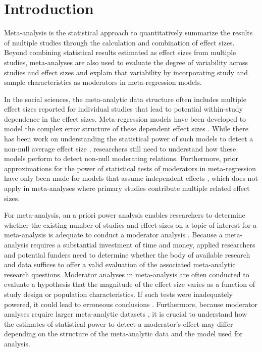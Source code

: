 \chapter{Introduction}

Meta-analysis is the statistical approach to quantitatively summarize the results of multiple studies through the calculation and combination of effect sizes. Beyond combining statistical results estimated as effect sizes from multiple studies, meta-analyses are also used to evaluate the degree of variability across studies and effect sizes and explain that variability by incorporating study and sample characteristics as moderators in meta-regression models. 

In the social sciences, the meta-analytic data structure often includes multiple effect sizes reported for individual studies that lead to potential within-study dependence in the effect sizes. Meta-regression models have been developed to model the complex error structure of these dependent effect sizes \autocite{vandennoortgate2013, hedges2010, viechtbauer2010a, sera2019, pustejovsky2022}. While there has been work on understanding the statistical power of such models to detect a non-null average effect size \autocite{vembye2023}, researchers still need to understand how these models perform to detect non-null moderating relations. Furthermore, prior approximations for the power of statistical tests of moderators in meta-regression have only been made for models that assume independent effects \autocite{hedges2004, jackson2017, valentine2010}, which does not apply in meta-analyses where primary studies contribute multiple related effect sizes. 

For meta-analysis, an a priori power analysis enables researchers to determine whether the existing number of studies and effect sizes on a topic of interest for a meta-analysis is adequate to conduct a moderator analysis \autocite{hedges2001}. Because a meta-analysis requires a substantial investment of time and money, applied researchers and potential funders need to determine whether the body of available research and data suffices to offer a valid evaluation of the associated meta-analytic research questions. Moderator analyses in meta-analysis are often conducted to evaluate a hypothesis that the magnitude of the effect size varies as a function of study design or population characteristics. If such tests were inadequately powered, it could lead to erroneous conclusions \autocite{hedges2004}. Furthermore, because moderator analyses require larger meta-analytic datasets \autocite{hedges2004}, it is crucial to understand how the estimates of statistical power to detect a moderator's effect may differ depending on the structure of the meta-analytic data and the model used for analysis. 

